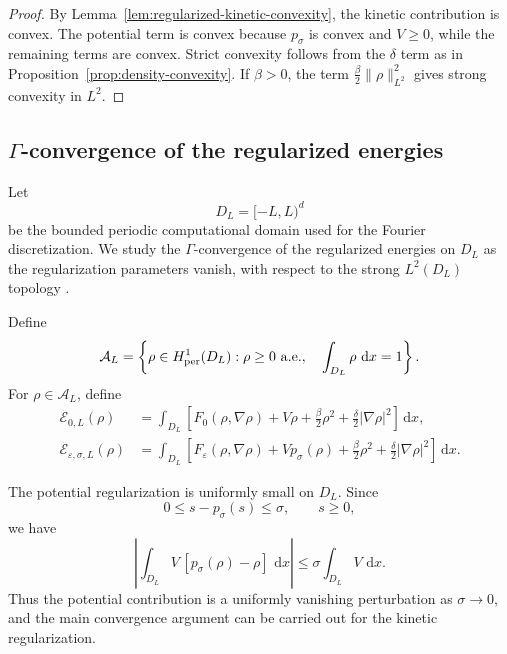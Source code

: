 \documentclass[11pt]{article}
\newcommand{\A}{\mathcal{A}}
\newcommand{\E}{\mathcal{E}}
\newcommand{\dd}{\,\mathrm{d}}
\newcommand{\eps}{\varepsilon}
\newcommand{\sig}{\sigma}
\theoremstyle{plain}
\theoremstyle{definition}
\numberwithin{equation}{section}
\begin{document}
\begin{proof}
By Lemma~\ref{lem:regularized-kinetic-convexity}, the kinetic
contribution is convex. The potential term is convex because
$p_\sig$ is convex and $V\ge0$, while the remaining terms are convex.
Strict convexity follows from the $\delta$ term as in
Proposition~\ref{prop:density-convexity}. If $\beta>0$, the term
$\frac{\beta}{2}\|\rho\|_{L^2}^2$ gives strong convexity in $L^2$.
\end{proof}




\subsection{\texorpdfstring{$\Gamma$}{Gamma}-convergence of the regularized energies}

Let
\[
D_L=[-L,L)^d
\]
be the bounded periodic computational domain used for the Fourier
discretization. We study the $\Gamma$-convergence of the regularized
energies on $D_L$ as the regularization parameters vanish, with
respect to the strong $L^2(D_L)$ topology
\cite{Braides2002}.

Define
\begin{equation}
\label{eq:admissible-density-box}
\A_L
=
\left\{
\rho\in H^1_{\rm per}(D_L):
\rho\ge0\ {\rm a.e.},
\quad
\int_{D_L}\rho\,\dd x=1
\right\}.
\end{equation}
For $\rho\in\A_L$, define
\begin{equation}
\label{eq:energies-DL}
\begin{aligned}
\E_{0,L}(\rho)
&=
\int_{D_L}
\left[
F_0(\rho,\nabla\rho)
+V\rho
+\frac{\beta}{2}\rho^2
+\frac{\delta}{2}|\nabla\rho|^2
\right]\dd x,\\
\E_{\eps,\sig,L}(\rho)
&=
\int_{D_L}
\left[
F_\eps(\rho,\nabla\rho)
+Vp_\sig(\rho)
+\frac{\beta}{2}\rho^2
+\frac{\delta}{2}|\nabla\rho|^2
\right]\dd x.
\end{aligned}
\end{equation}

The potential regularization is uniformly small on $D_L$. Since
\begin{equation}
\label{eq:potential-energy-defect}
0\le s-p_\sig(s)\le\sig,
\qquad s\ge0,
\end{equation}
we have
\[
\left|
\int_{D_L}
V\,[p_\sig(\rho)-\rho]\,\dd x
\right|
\le
\sig\int_{D_L}V\,\dd x.
\]
Thus the potential contribution is a uniformly vanishing perturbation
as $\sig\to0$, and the main convergence argument can be carried out
for the kinetic regularization.
\end{document}
